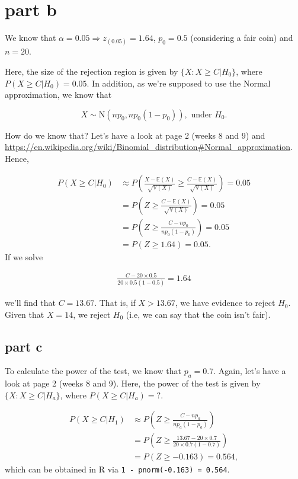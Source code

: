 \documentclass[12pt]{article}
\begin{document}
\section*{part b}
We know that $\alpha = 0.05 \Rightarrow z_{(0.05)} = 1.64$, $p_{0} = 0.5$ (considering a fair coin) and $n = 20$.

Here, the size of the rejection region is given by $\{ X: X \geq C | H_{0}\}$, where $P(X \geq C| H_{0}) = 0.05$. In addition, as we're supposed to use the Normal approximation, we know that

\begin{equation}
    X \sim \mbox{N}\left(np_{0}, np_{0}(1-p_{0}) \right), \mbox{ under } H_{0}.
\end{equation}

How do we know that? Let's have a look at page 2 (weeks 8 and 9) and \url{https://en.wikipedia.org/wiki/Binomial_distribution#Normal_approximation}. Hence,

\begin{align}
    P(X \geq C| H_{0}) & \approx P\left(\frac{X - \mathbb{E}(X)}{\sqrt{\mathbb{V}(X)}} \geq \frac{C - \mathbb{E}(X)}{\sqrt{\mathbb{V}(X)}}\right) = 0.05 \\
    & = P\left(Z \geq \frac{C - \mathbb{E}(X)}{\sqrt{\mathbb{V}(X)}}\right) = 0.05 \\
    & = P\left(Z \geq \frac{C - np_{0}}{np_{0}(1-p_{0})}\right) = 0.05 \\
    & = P\left( Z \geq 1.64 \right) = 0.05.
\end{align}
If we solve

\begin{align}
\frac{C - 20 \times 0.5}{20 \times 0.5(1-0.5)} = 1.64
\end{align}

we'll find that $C = 13.67$. That is, if $X > 13.67$, we have evidence to reject $H_{0}$. Given that $X = 14$, we reject $H_{0}$ (i.e, we can say that the coin isn't fair).


\subsection*{part c}


To calculate the power of the test, we know that $p_{a} = 0.7$. Again, let's have a look at page 2 (weeks 8 and 9). Here, the power of the test is given by $\{ X: X \geq C | H_{a}\}$, where $P(X \geq C| H_{a}) = ?$.

\begin{align}
    P(X \geq C| H_{1}) & \approx P\left( Z \geq \frac{C - np_{a}}{np_{a}(1-p_{a})} \right) \\
    & = P\left( Z \geq \frac{13.67 - 20 \times 0.7}{20 \times 0.7(1-0.7)} \right) \\
    & = P(Z \geq -0.163) = 0.564,
\end{align}
which can be obtained in R via \texttt{1 - pnorm(-0.163) = 0.564}.
\end{document}
